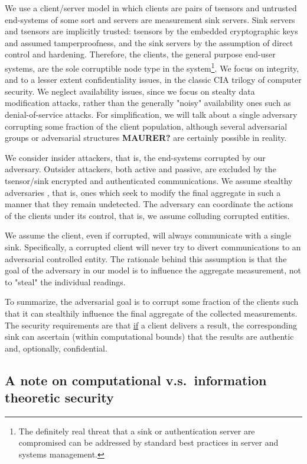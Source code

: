 We use a client/server model in which clients are pairs of tsensors and untrusted end-systems of some sort and servers are measurement sink servers. Sink servers and tsensors are implicitly trusted: tsensors by the embedded cryptographic keys and assumed tamperproofness, and the sink servers by the assumption of direct control and hardening. Therefore, the clients, the general purpose end-user systems, are the sole corruptible node type in the system\footnote{The definitely real threat that a sink or authentication server are compromised can be addressed by standard best practices in server and systems management.}. We focus on integrity, and to a lesser extent confidentiality issues, in the classic CIA trilogy of computer security. We neglect availability issues, since we focus on stealty data modification attacks, rather than the generally "noisy" availability ones such as denial-of-service attacks. For simplification, we will talk about a single adversary corrupting some fraction of the client population, although several adversarial groups or adversarial structures \cite{} \textbf{MAURER?} are certainly possible in reality.

We consider insider attackers, that is, the end-systems corrupted by our adversary. Outsider attackers, both active and passive, are excluded by the tsensor/sink encrypted and authenticated communications. We assume stealthy adversaries , that is, ones which seek to modify the final aggregate in such a manner that they remain undetected. The adversary can coordinate the actions of the clients under its control, that is, we assume colluding corrupted entities.

We assume the client, even if corrupted, will always communicate with a single sink. Specifically, a corrupted client will never try to divert communications to an adversarial controlled entity. The rationale behind this assumption is that the goal of the adversary in our model is to influence the aggregate measurement, not to "steal" the individual readings.

To summarize, the adversarial goal is to corrupt some fraction of the clients such that it can stealthily influence the final aggregate of the collected measurements. The security requirements are that \underline{if} a client delivers a result, the corresponding sink can ascertain (within computational bounds) that the results are authentic and, optionally, confidential.

\subsection*{A note on computational v.s.\ information theoretic security}

